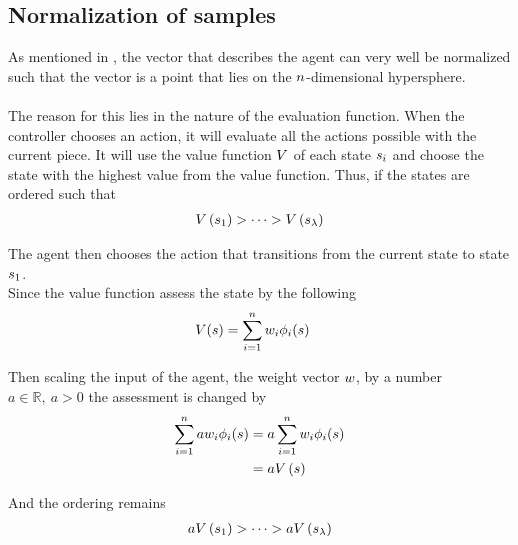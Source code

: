 \subsection{Normalization of samples \label{normalSamples}}
As mentioned in \citep{boumaza2009}, the vector that
describes the agent can very well be normalized such that the vector
is a point that lies on the $n$-dimensional hypersphere.\\
\\
The reason for this lies in the nature of the evaluation function.
When the controller chooses an action, it will evaluate all the
actions possible with the current piece. It will use the 
value function $V$ of each state $s_i$ and 
choose the state with the highest value from the value function.
Thus, if the states are ordered such that
\begin{align}
V \left(  s_1 \right) 
> \dots 
> V \left( s_\lambda \right)
\end{align}

The agent then chooses the action that transitions from the current state 
to state $s_1$.\\
Since the value function assess the state by the following
\begin{align}
V (s ) &= 
\sum_{i=1}^{n} w _{i}\phi _{i}(s )
\end{align}

Then scaling the input of the agent, the weight vector $w$, by a
number $a \in \mathbb{R}, \ a > 0$ the assessment is changed by
\begin{align}
\sum_{i=1}^{n} a w _{i}\phi _{i}(s ) &= 
a\sum_{i=1}^{n} w _{i}\phi _{i}(s )\\
&= a V \left( s \right)
\end{align}

And the ordering remains
\begin{align}
a V \left(  s_1 \right) 
> \dots 
> a V \left( s_\lambda \right)
\end{align}

